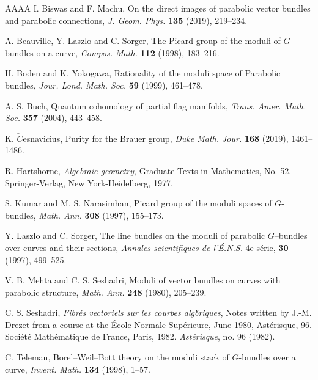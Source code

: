 \documentclass[10pt,reqno]{amsart}
\theoremstyle{myroman}
\numberwithin{equation}{section}
\begin{document}
\begin{thebibliography}{AAAA}
			 I. Biswas and F. Machu, On the direct images of parabolic vector 
			bundles and parabolic connections, \textit{J. Geom. Phys.} {\bf 135} (2019), 219--234.
			
			 A. Beauville, Y. Laszlo and C. Sorger, The Picard group of the moduli of $G$-bundles on a 
			curve, \textit{Compos. Math.} \textbf{112} (1998), 183--216.
			
			 H. Boden and K. Yokogawa, Rationality of the moduli space of Parabolic bundles, \textit{Jour. 
				Lond. Math. Soc.} {\bf 59} (1999), 461--478.
			
			 A. S. Buch, Quantum cohomology of partial flag manifolds, \textit{Trans. Amer. Math. Soc.} 
			\textbf{357} (2004), 443--458.
			
			 K. $\check{C}$esnavi$\check{c}$ius, Purity for the Brauer group, \textit{Duke Math. Jour.} {\bf 
				168} (2019), 1461--1486.
			
			
			 R. Hartshorne, {\it Algebraic geometry}, Graduate Texts in Mathematics, No. 52. Springer-Verlag,
			New York-Heidelberg, 1977.
			
			 S. Kumar and M. S. Narasimhan, Picard group of the moduli spaces of $G$-bundles, 
			\textit{Math. Ann.} \textbf{308} (1997), 155--173.
			
			 Y. Laszlo and C. Sorger, The line bundles on the moduli of parabolic $G$--bundles over curves 
			and their sections, \textit{Annales scientifiques de l'\'E.N.S.} 4e s\'erie, \textbf{30} (1997), 
			499--525.
			
			 V. B. Mehta and C. S. Seshadri, Moduli of vector bundles on curves
			with parabolic structure, \textit{Math. Ann.} {\bf 248} (1980), 205--239.	
			
			 C. S. Seshadri, {\it Fibr\'es vectoriels sur les courbes alg\'briques}, Notes 
			written by J.-M. Drezet from a course at the \'Ecole Normale Sup\'erieure, June 1980, 
			Ast\'erisque, 96. Soci\'et\'e Math\'ematique de France, Paris, 1982.
			{\it Ast\'erisque}, no. 96 (1982).
			
			 C. Teleman, Borel--Weil--Bott theory on the moduli stack of $G$-bundles over a curve, 
			\textit{Invent. Math.} \textbf{134} (1998), 1--57.
			
			
		\end{thebibliography}
	
\end{document}
